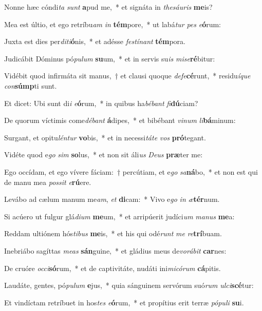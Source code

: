 \item Nonne hæc cóndi\textit{ta} \textit{sunt} \textbf{a}pud me,~* et signáta in \textit{the}\textit{sáu}\textit{ris} \textbf{me}is?
\item Mea est últio, et ego retríbu\textit{am} \textit{in} \textbf{tém}pore,~* ut labá\textit{tur} \textit{pes} \textit{e}\textbf{ó}rum:
\item Juxta est dies per\textit{di}\textit{ti}\textbf{ó}nis,~* et adésse \textit{fes}\textit{tí}\textit{nant} \textbf{tém}pora.
\item Judicábit Dóminus pó\textit{pu}\textit{lum} \textbf{su}um,~* et in servis su\textit{is} \textit{mi}\textit{se}\textbf{ré}bitur:
\item Vidébit quod infirmáta sit manus,~† et clausi quoque \textit{de}\textit{fe}\textbf{cé}runt,~* residu\textit{í}\textit{que} \textit{con}\textbf{súmp}ti sunt.
\item Et dicet: Ubi sunt di\textit{i} \textit{e}\textbf{ó}rum,~* in quibus ha\textit{bé}\textit{bant} \textit{fi}\textbf{dú}ciam?
\item De quorum víctimis come\textit{dé}\textit{bant} \textbf{á}dipes,~* et bibébant \textit{vi}\textit{num} \textit{li}\textbf{bá}minum:
\item Surgant, et opitu\textit{lén}\textit{tur} \textbf{vo}bis,~* et in necessi\textit{tá}\textit{te} \textit{vos} \textbf{pró}tegant.
\item Vidéte quod e\textit{go} \textit{sim} \textbf{so}lus,~* et non sit áli\textit{us} \textit{De}\textit{us} \textbf{præ}ter me:
\item Ego occídam, et ego vívere fáciam:~† percútiam, et e\textit{go} \textit{sa}\textbf{ná}bo,~* et non est qui de manu mea \textit{pos}\textit{sit} \textit{e}\textbf{rú}ere.
\item Levábo ad cælum manum me\textit{am}, \textit{et} \textbf{di}cam:~* Vivo e\textit{go} \textit{in} \textit{æ}\textbf{tér}num.
\item Si acúero ut fulgur glá\textit{di}\textit{um} \textbf{me}um,~* et arripúerit judíci\textit{um} \textit{ma}\textit{nus} \textbf{me}a:
\item Reddam ultiónem hós\textit{ti}\textit{bus} \textbf{me}is,~* et his qui odé\textit{runt} \textit{me} \textit{re}\textbf{trí}buam.
\item Inebriábo sagíttas \textit{me}\textit{as} \textbf{sán}guine,~* et gládius meus de\textit{vo}\textit{rá}\textit{bit} \textbf{car}nes:
\item De cruóre \textit{oc}\textit{ci}\textbf{só}rum,~* et de captivitáte, nudáti ini\textit{mi}\textit{có}\textit{rum} \textbf{cá}pitis.
\item Laudáte, gentes, pó\textit{pu}\textit{lum} \textbf{e}jus,~* quia sánguinem servórum suó\textit{rum} \textit{ul}\textit{ci}\textbf{scé}tur:
\item Et vindíctam retríbuet in hos\textit{tes} \textit{e}\textbf{ó}rum,~* et propítius erit terræ \textit{pó}\textit{pu}\textit{li} \textbf{su}i.
